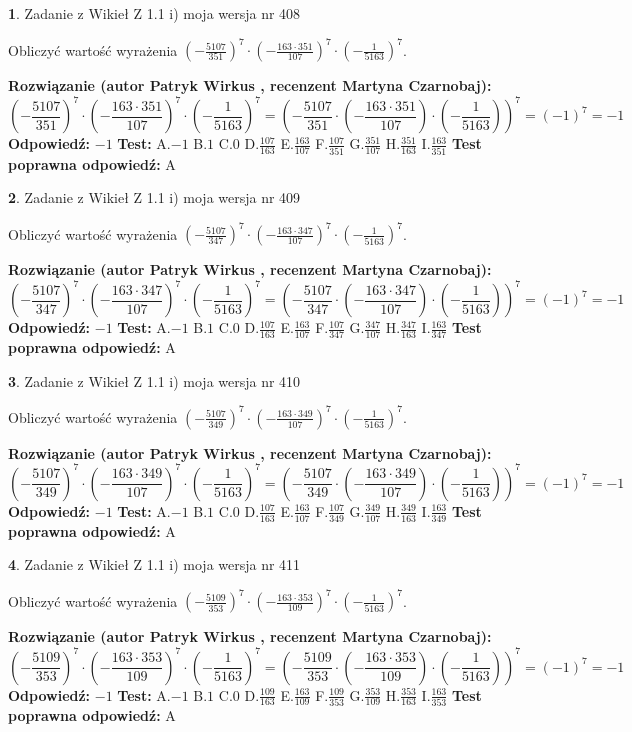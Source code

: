 \documentclass[12pt, a4paper]{article}
\theoremstyle{definition} %
\newtheorem{zad}{}
\newcommand{\zadStart}[1]{\begin{zad}#1\newline}
\newcommand{\zadStop}{\end{zad}}
\newcommand{\rozwStart}[2]{\noindent \textbf{Rozwiązanie (autor #1 , recenzent #2): }\newline}
\newcommand{\rozwStop}{\newline}
\newcommand{\odpStart}{\noindent \textbf{Odpowiedź:}\newline}
\newcommand{\odpStop}{\newline}
\newcommand{\testStart}{\noindent \textbf{Test:}\newline}
\newcommand{\testStop}{\newline}
\newcommand{\kluczStart}{\noindent \textbf{Test poprawna odpowiedź:}\newline}
\newcommand{\kluczStop}{\newline}
\begin{document}
\zadStart{Zadanie z Wikieł Z 1.1 i) moja wersja nr 408}

Obliczyć wartość wyrażenia $(-\frac{5107}{351})^{7} \cdot (-\frac{163 \cdot 351}{107})^{7} \cdot (-\frac{1}{5163})^{7}$.
\zadStop
\rozwStart{Patryk Wirkus}{Martyna Czarnobaj}
$$(-\frac{5107}{351})^{7} \cdot (-\frac{163 \cdot 351}{107})^{7} \cdot (-\frac{1}{5163})^{7} = (-\frac{5107}{351} \cdot (-\frac{163 \cdot 351}{107}) \cdot (-\frac{1}{5163}))^{7} = (-1)^{7} = -1$$
\rozwStop
\odpStart
$-1$
\odpStop
\testStart
A.$-1$ B.$1$ C.$0$ D.$\frac{107}{163}$ E.$\frac{163}{107}$
F.$\frac{107}{351}$ G.$\frac{351}{107}$
H.$\frac{351}{163}$
I.$\frac{163}{351}$
\testStop
\kluczStart
A
\kluczStop



\zadStart{Zadanie z Wikieł Z 1.1 i) moja wersja nr 409}

Obliczyć wartość wyrażenia $(-\frac{5107}{347})^{7} \cdot (-\frac{163 \cdot 347}{107})^{7} \cdot (-\frac{1}{5163})^{7}$.
\zadStop
\rozwStart{Patryk Wirkus}{Martyna Czarnobaj}
$$(-\frac{5107}{347})^{7} \cdot (-\frac{163 \cdot 347}{107})^{7} \cdot (-\frac{1}{5163})^{7} = (-\frac{5107}{347} \cdot (-\frac{163 \cdot 347}{107}) \cdot (-\frac{1}{5163}))^{7} = (-1)^{7} = -1$$
\rozwStop
\odpStart
$-1$
\odpStop
\testStart
A.$-1$ B.$1$ C.$0$ D.$\frac{107}{163}$ E.$\frac{163}{107}$
F.$\frac{107}{347}$ G.$\frac{347}{107}$
H.$\frac{347}{163}$
I.$\frac{163}{347}$
\testStop
\kluczStart
A
\kluczStop



\zadStart{Zadanie z Wikieł Z 1.1 i) moja wersja nr 410}

Obliczyć wartość wyrażenia $(-\frac{5107}{349})^{7} \cdot (-\frac{163 \cdot 349}{107})^{7} \cdot (-\frac{1}{5163})^{7}$.
\zadStop
\rozwStart{Patryk Wirkus}{Martyna Czarnobaj}
$$(-\frac{5107}{349})^{7} \cdot (-\frac{163 \cdot 349}{107})^{7} \cdot (-\frac{1}{5163})^{7} = (-\frac{5107}{349} \cdot (-\frac{163 \cdot 349}{107}) \cdot (-\frac{1}{5163}))^{7} = (-1)^{7} = -1$$
\rozwStop
\odpStart
$-1$
\odpStop
\testStart
A.$-1$ B.$1$ C.$0$ D.$\frac{107}{163}$ E.$\frac{163}{107}$
F.$\frac{107}{349}$ G.$\frac{349}{107}$
H.$\frac{349}{163}$
I.$\frac{163}{349}$
\testStop
\kluczStart
A
\kluczStop



\zadStart{Zadanie z Wikieł Z 1.1 i) moja wersja nr 411}

Obliczyć wartość wyrażenia $(-\frac{5109}{353})^{7} \cdot (-\frac{163 \cdot 353}{109})^{7} \cdot (-\frac{1}{5163})^{7}$.
\zadStop
\rozwStart{Patryk Wirkus}{Martyna Czarnobaj}
$$(-\frac{5109}{353})^{7} \cdot (-\frac{163 \cdot 353}{109})^{7} \cdot (-\frac{1}{5163})^{7} = (-\frac{5109}{353} \cdot (-\frac{163 \cdot 353}{109}) \cdot (-\frac{1}{5163}))^{7} = (-1)^{7} = -1$$
\rozwStop
\odpStart
$-1$
\odpStop
\testStart
A.$-1$ B.$1$ C.$0$ D.$\frac{109}{163}$ E.$\frac{163}{109}$
F.$\frac{109}{353}$ G.$\frac{353}{109}$
H.$\frac{353}{163}$
I.$\frac{163}{353}$
\testStop
\kluczStart
A
\kluczStop
\end{document}
